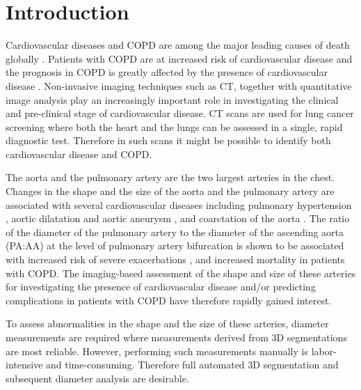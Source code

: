 
\chapter{Introduction}\label{chap:introduction}


Cardiovascular diseases and \gls{COPD} are among the major leading causes of death globally \cite{ritchie2018causes}. Patients with \gls{COPD} are at increased risk of cardiovascular disease\cite{roversi2016chronic, ruparel2019evaluation} and the prognosis in \gls{COPD} is greatly affected by the presence of cardiovascular disease \cite{andre2019COPD, carter2019association}. Non-invasive imaging techniques such as \gls{CT}, together with quantitative image analysis play an increasingly important role in investigating the clinical and pre-clinical stage of cardiovascular disease. \gls{CT} scans are used for lung cancer screening \cite{pedersen2009danish, labaki2017role, mets2012quantitative, wells2012pulmonary, mets2011identification, mets2012computed, singhvi2020computed, heuvelmans2019screening, li2019importance, suh2020coronary,ruparel2019evaluation,oudkerk2017european} where both the heart and the lungs can be assessed in a single, rapid diagnostic test. Therefore in such scans it might be possible to identify both cardiovascular disease and \gls{COPD}.

The aorta and the pulmonary artery are the two largest arteries in the chest. Changes in the shape and the size of the aorta and the pulmonary artery are associated with several cardiovascular diseases including pulmonary hypertension \cite{raymond2014significance, truong2018four}, aortic dilatation and aortic aneurysm \cite{american20102010,wolak2008aortic}, and coarctation of the aorta \cite{frandsen2018ascending, von2002predictors}. The ratio of the diameter of the pulmonary artery to the diameter of the ascending aorta (PA:AA) at the level of pulmonary artery bifurcation is shown to be associated with increased risk of severe exacerbations \cite{rho2018ct,wells2012pulmonary}, and increased mortality \cite{terzikhan2017pulmonary} in patients with COPD. The imaging-based assessment of the shape and size of these arteries for investigating the presence of cardiovascular disease and/or predicting complications in patients with COPD have therefore rapidly gained interest.

To assess abnormalities in the shape and the size of these arteries, diameter measurements are required where measurements derived from 3D segmentations are most reliable. However, performing such measurements manually is labor-intensive and time-consuming. Therefore full automated 3D segmentation and subsequent diameter analysis are desirable.

